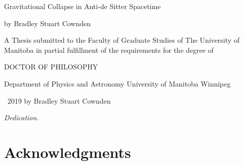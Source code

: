 \documentclass[12pt, a4paper]{report} %
\numberwithin{equation}{chapter}
\begin{document}
\setcounter{secnumdepth}{4}


\begin{titlepage}
\begin{center}
\vspace*{1.5cm}

{\Large Gravitational Collapse in Anti-de Sitter Spacetime}

\vspace{1.5cm}
 
by \linebreak
Bradley Stuart Cownden
\vspace{1.5cm}

A Thesis submitted to the Faculty of Graduate Studies of \linebreak
The University of Manitoba \linebreak 
in partial fulfillment of the requirements for the degree of

\vspace{1.5cm}

DOCTOR OF PHILOSOPHY

\vspace{1.5cm}

Department of Physics and Astronomy \linebreak
University of Manitoba \linebreak
Winnipeg

\vspace{1.5cm}

\textcopyright \, 2019 by Bradley Stuart Cownden
\end{center}
\end{titlepage}



\newpage
\vspace*{\fill}
\begin{center}
{\it Dedication.}
\end{center}
\vspace*{\fill}
\clearpage

\newpage


\vspace*{\fill}
\section*{Acknowledgments}
\end{document}
